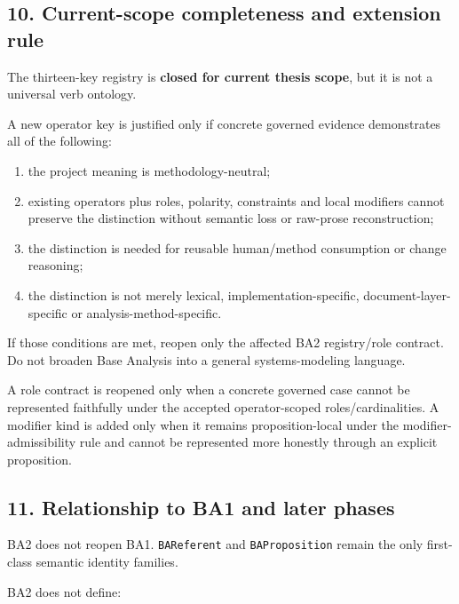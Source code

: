 \documentclass[11pt,a4paper]{article}
\providecommand{\tightlist}{\setlength{\itemsep}{0pt}\setlength{\parskip}{0pt}}
\begin{document}
\subsection{10. Current-scope completeness and extension rule}\label{current-scope-completeness-and-extension-rule}

The thirteen-key registry is \textbf{closed for current thesis scope}, but it is not a universal verb ontology.

A new operator key is justified only if concrete governed evidence demonstrates all of the following:

\begin{enumerate}
\def\labelenumi{\arabic{enumi}.}
\tightlist
\item
  the project meaning is methodology-neutral;
\item
  existing operators plus roles, polarity, constraints and local modifiers cannot preserve the distinction without semantic loss or raw-prose reconstruction;
\item
  the distinction is needed for reusable human/method consumption or change reasoning;
\item
  the distinction is not merely lexical, implementation-specific, document-layer-specific or analysis-method-specific.
\end{enumerate}

If those conditions are met, reopen only the affected BA2 registry/role contract. Do not broaden Base Analysis into a general systems-modeling language.

A role contract is reopened only when a concrete governed case cannot be represented faithfully under the accepted operator-scoped roles/cardinalities. A modifier kind is added only when it remains proposition-local under the modifier-admissibility rule and cannot be represented more honestly through an explicit proposition.

\subsection{11. Relationship to BA1 and later phases}\label{relationship-to-ba1-and-later-phases}

BA2 does not reopen BA1. \texttt{BAReferent} and \texttt{BAProposition} remain the only first-class semantic identity families.

BA2 does not define:
\end{document}
